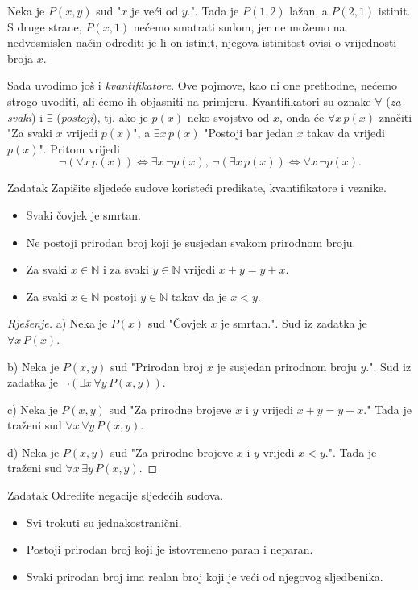\begin{exmp}
Neka je \(P(x, y)\) sud "\(x\) je veći od \(y\).". Tada je \(P(1, 2)\) lažan, a \(P(2, 1)\) istinit. S druge strane, \(P(x, 1)\) nećemo smatrati sudom, jer ne možemo na nedvosmislen način odrediti je li on istinit, njegova istinitost ovisi o vrijednosti broja \(x\). 
\end{exmp}
Sada uvodimo još i \textit{kvantifikatore}. Ove pojmove, kao ni one prethodne, nećemo strogo uvoditi, ali ćemo ih objasniti na primjeru. Kvantifikatori su oznake \(\forall\) (\textit{za svaki}) i \(\exists\) (\textit{postoji}), tj. ako je \(p(x)\) neko svojstvo od \(x\), onda će \(\forall{x}\, p(x)\) značiti "Za svaki \(x\) vrijedi \(p(x)\)", a \(\exists{x}\, p(x)\) "Postoji bar jedan \(x\) takav da vrijedi \(p(x)\)". Pritom vrijedi
\[\neg \left(\forall{x}\, p(x)\right)\Leftrightarrow \exists{x}\, \neg p(x), \, \neg \left(\exists{x}\, p(x)\right)\Leftrightarrow \forall{x}\, \neg p(x).\]
\begin{exercise}{Zadatak}
Zapišite sljedeće sudove koristeći predikate, kvantifikatore i veznike.
\begin{itemize}
\item[a)] Svaki čovjek je smrtan.
\item[b)] Ne postoji prirodan broj koji je susjedan svakom prirodnom broju.
\item[c)] Za svaki \(x\in \mathbb{N}\) i za svaki \(y\in \mathbb{N}\) vrijedi \(x+y=y+x\).
\item[d)] Za svaki \(x\in \mathbb{N}\) postoji \(y\in \mathbb{N}\) takav da je \(x<y\).
\end{itemize}
\end{exercise}
\begin{proof}[Rješenje]
a) Neka je \(P(x)\) sud "Čovjek \(x\) je smrtan.". Sud iz zadatka je \(\forall{x}\, P(x)\).

b) Neka je \(P(x, y)\) sud "Prirodan broj \(x\) je susjedan prirodnom broju \(y\).". Sud iz zadatka je \(\neg(\exists{x}\, \forall{y}\, P(x, y))\).

c) Neka je \(P(x, y)\) sud "Za prirodne brojeve \(x\) i \(y\) vrijedi \(x+y=y+x\)." Tada je traženi sud \(\forall{x}\, \forall{y}\, P(x, y)\).

d) Neka je \(P(x, y)\) sud "Za prirodne brojeve \(x\) i \(y\) vrijedi \(x<y\).". Tada je traženi sud \(\forall{x}\,\exists{y}\, P(x, y)\).
\end{proof}
\begin{exercise}{Zadatak}
Odredite negacije sljedećih sudova.
\begin{itemize}
\item[a)] Svi trokuti su jednakostranični.
\item[b)] Postoji prirodan broj koji je istovremeno paran i neparan.
\item[c)] Svaki prirodan broj ima realan broj koji je veći od njegovog sljedbenika. 
\end{itemize}
\end{exercise}
